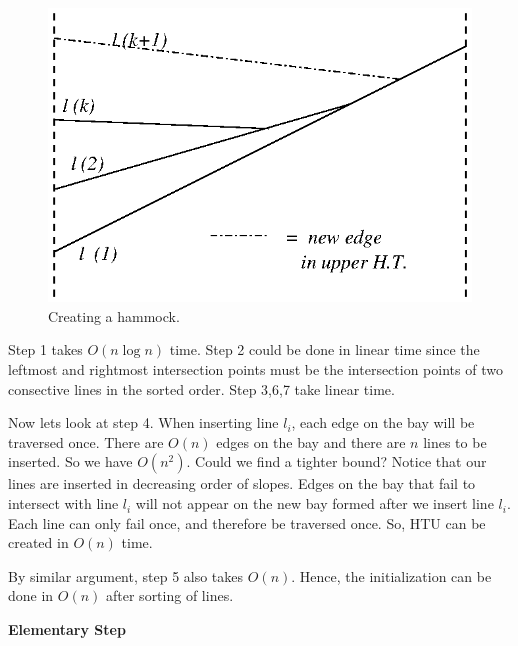 \documentclass[12pt]{article}
\begin{document}
        \begin{figure}
            \center
            \includegraphics[viewport=265 328 348 390]{initialization.eps}
            \caption{Creating a hammock.}
            \label{figure.init}
        \end{figure}

        Step 1 takes $O(n\log n)$ time. Step 2 could be done in linear time
        since the leftmost and rightmost intersection points must be the 
        intersection points of two consective lines in the sorted order. Step
        3,6,7 take linear time. 

        Now lets look at step 4. When inserting line $l_{i}$, each edge on the
        bay will be traversed once. There are $O(n)$ edges on the bay and
        there are $ n $ lines to be inserted. So we have $O(n^2)$. Could we
        find a tighter bound? Notice that our lines are inserted in decreasing
        order of slopes. Edges on the bay that fail to intersect with line
        $l_{i}$ will not appear on the new bay formed after we insert line
        $l_{i}$. Each line can only fail once, and therefore be traversed once.
        So, HTU can be created in $O(n)$ time.

        By similar argument, step 5 also takes $O(n)$. Hence, the initialization
        can be done in $O(n)$ after sorting of lines.

        \vspace{.2 cm}

        {\bf Elementary Step}

        \vspace{.2 cm}
\end{document}
